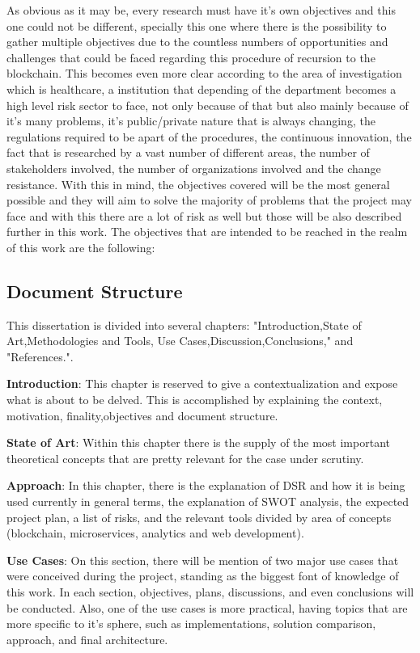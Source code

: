 As obvious as it may be, every research must have it's own objectives and this one could not be different, specially this one where there is the possibility to gather multiple objectives due to the countless numbers of opportunities and challenges that could be faced regarding this procedure of recursion to the blockchain. This becomes even more clear according to the area of investigation which is healthcare, a institution that depending of the department becomes a high level risk sector to face, not only because of that but also mainly because of it's many problems, it's public/private nature that is always changing, the regulations required to be apart of the procedures, the continuous innovation, the fact that is researched by a vast number of different areas, the number of stakeholders involved, the number of organizations involved and the change resistance. With this in mind, the objectives covered will be the most general possible and they will aim to solve the majority of problems that the project may face and with this there are a lot of risk as well but those will be also described further in this work. The objectives that are intended to be reached in the realm of this work are the following:

\subsection{Document Structure}
This dissertation is divided into several chapters: "Introduction,State of Art,Methodologies and Tools, Use Cases,Discussion,Conclusions," and "References.".

\textbf {Introduction}: This chapter is reserved to give a contextualization and expose what is about to be delved. This is accomplished by explaining the context, motivation, finality,objectives and document structure.

\textbf{State of Art}: Within this chapter there is the supply of the most important theoretical concepts that are pretty relevant for the case under scrutiny.

\textbf{Approach}: In this chapter, there is the explanation of DSR and how it is being used currently in general terms, the explanation of SWOT analysis, the expected project plan, a list of risks, and the relevant tools divided by area of concepts (blockchain, microservices, analytics and web development).

\textbf {Use Cases}: On this section, there will be mention of two major use cases that were conceived during the project, standing as the biggest font of knowledge of this work. In each section, objectives, plans, discussions, and even conclusions will be conducted. Also, one of the use cases is more practical, having topics that are more specific to it's sphere, such as implementations, solution comparison, approach, and final architecture.

